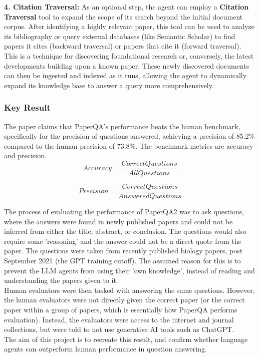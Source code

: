 \textbf{4. Citation Traversal:}
As an optional step, the agent can employ a \textbf{Citation Traversal} tool to expand the scope of its search beyond the initial document corpus. After identifying a highly relevant paper, this tool can be used to analyze its bibliography or query external databases (like Semantic Scholar) to find papers it cites (backward traversal) or papers that cite it (forward traversal). This is a technique for discovering foundational research or, conversely, the latest developments building upon a known paper. These newly discovered documents can then be ingested and indexed as it runs, allowing the agent to dynamically expand its knowledge base to answer a query more comprehensively. \\

\subsubsection{Key Result}
The paper claims that PaperQA's performance beats the human benchmark, specifically for the precision of questions answered, achieving a precision of 85.2\% compared to the human precision of 73.8\%. The benchmark metrics are accuracy and precision. \\

\begin{equation}
    Accuracy = \frac{Correct Questions}{All Questions}
\end{equation}


\begin{equation}
    Precision = \frac{Correct Questions}{Answered Questions}
\end{equation}

The process of evaluating the performance of PaperQA2 was to ask questions, where the answers were found in newly published papers and could not be inferred from either the title, abstract, or conclusion.
The questions would also require some 'reasoning' and the answer could not be a direct quote from the paper.  
The questions were taken from recently published biology papers, post September 2021 (the GPT training cutoff). The assumed reason for this is to prevent the LLM agents from using their 'own knowledge', instead of reading and understanding the papers given to it. \\

Human evaluators were then tasked with answering the same questions. 
However, the human evaluators were not directly given the correct paper (or the correct paper within a group of papers, which is essentially how PaperQA performs evaluation). 
Instead, the evaluators were access to the internet and journal collections, but were told to not use generative AI tools such as ChatGPT.\\

The aim of this project is to recreate this result, and confirm whether language agents can outperform human performance in question answering. \\

